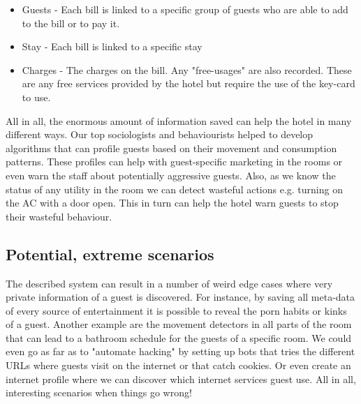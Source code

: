 \begin{itemize}
	\item Guests - Each bill is linked to a specific group of guests who are able to add to the bill or to pay it.
	\item Stay - Each bill is linked to a specific stay
	\item Charges - The charges on the bill. Any "free-usages" are also recorded. These are any free services provided by the hotel but require the use of the key-card to use.
\end{itemize}

All in all, the enormous amount of information saved can help the hotel in many different ways. Our top sociologists and behaviourists helped to develop algorithms that can profile guests based on their movement and consumption patterns. These profiles can help with guest-specific marketing in the rooms or even warn the staff about potentially aggressive guests. Also, as we know the status of any utility in the room we can detect wasteful actions e.g. turning on the AC with a door open. This in turn can help the hotel warn guests to stop their wasteful behaviour.

\subsection{Potential, extreme scenarios}
\label{sec:extreme_scen}
The described system can result in a number of weird edge cases where very private information of a guest is discovered. For instance, by saving all meta-data of every source of entertainment it is possible to reveal the porn habits or kinks of a guest. Another example are the movement detectors in all parts of the room that can lead to a bathroom schedule for the guests of a specific room. We could even go as far as to "automate hacking" by setting up bots that tries the different URLs where guests visit on the internet or that catch cookies. Or even create an internet profile where we can discover which internet services guest use. All in all, interesting scenarios when things go wrong!

